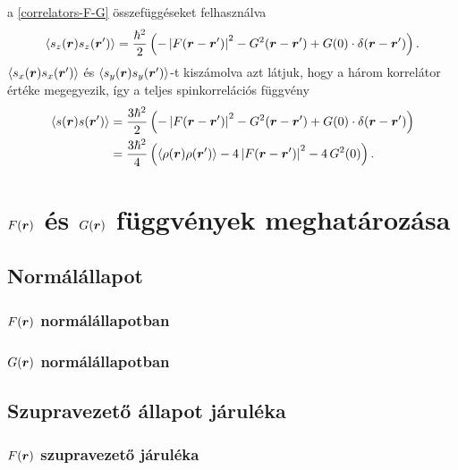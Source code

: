 \documentclass[a4paper,12pt,titlepage]{article}
\newcommand{\RR}{{\vb*{r}}}
\begin{document}
a \eqref{correlators-F-G} összefüggéseket felhasználva
\begin{equation}
	\left< s_z(\RR) s_z(\RR^\prime) \right> = \frac{\hbar^2}{2} \left( -\left| F(\RR - \RR^\prime) \right|^2 - G^2(\RR - \RR^\prime) + G(0) \cdot \delta(\RR - \RR^\prime) \right).
\end{equation}
$\left< s_x(\RR) s_x(\RR^\prime) \right>$ és $\left< s_y(\RR) s_y(\RR^\prime) \right>$-t kiszámolva azt látjuk, hogy a három korrelátor értéke megegyezik, így a teljes spinkorrelációs függvény
\begin{equation}
\begin{split}
	\left< s(\RR) s(\RR^\prime) \right> & = \frac{3 \hbar^2}{2} \left( -\left| F(\RR - \RR^\prime) \right|^2 - G^2(\RR - \RR^\prime) + G(0) \cdot \delta(\RR - \RR^\prime) \right) \\
	& = \frac{3 \hbar^2}{4} \left( \left< \rho(\RR) \rho(\RR^\prime) \right> - 4 \left| F(\RR - \RR^\prime) \right|^2 - 4 \, G^2(0) \right).
\end{split}
\end{equation}


\section{$F(\RR)$ és $G(\RR)$ függvények meghatározása}

\subsection{Normálállapot}

\subsubsection{$F(\RR)$ normálállapotban}
\subsubsection{$G(\RR)$ normálállapotban}

\subsection{Szupravezető állapot járuléka}

\subsubsection{$F(\RR)$ szupravezető járuléka}
\end{document}
